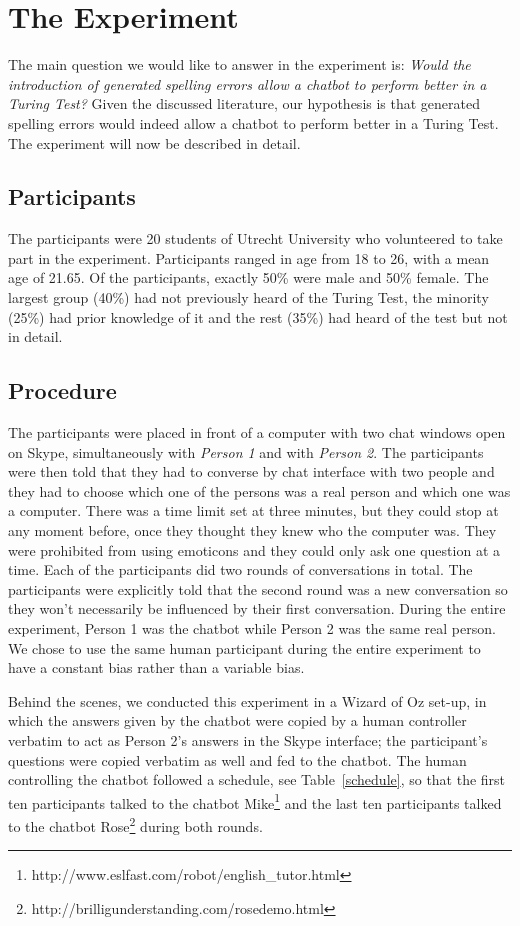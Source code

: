\section{The Experiment}
The main question we would like to answer in the experiment is: \textit{Would the introduction of generated spelling errors allow a chatbot to perform better in a Turing Test?} Given the discussed literature, our hypothesis is that generated spelling errors would indeed allow a chatbot to perform better in a Turing Test. The experiment will now be described in detail.


\subsection{Participants}
The participants were 20 students of Utrecht University who volunteered to take part in the experiment. Participants ranged in age from 18 to 26, with a mean age of 21.65. Of the participants, exactly 50\% were male and 50\% female. The largest group (40\%) had not previously heard of the Turing Test, the minority (25\%) had prior knowledge of it and the rest (35\%) had heard of the test but not in detail.


\subsection{Procedure}
The participants were placed in front of a computer with two chat windows open on Skype, simultaneously with \textit{Person 1} and with \textit{Person 2}. The participants were then told that they had to converse by chat interface with two people and they had to choose which one of the persons was a real person and which one was a computer. There was a time limit set at three minutes, but they could stop at any moment before, once they thought they knew who the computer was. They were prohibited from using emoticons and they could only ask one question at a time. Each of the participants did two rounds of conversations in total. The participants were explicitly told that the second round was a new conversation so they won't necessarily be influenced by their first conversation. During the entire experiment, Person 1 was the chatbot while Person 2 was the same real person. We chose to use the same human participant during the entire experiment to have a constant bias rather than a variable bias.

Behind the scenes, we conducted this experiment in a Wizard of Oz set-up, in which the answers given by the chatbot were copied by a human controller verbatim to act as Person 2's answers in the Skype interface; the participant's questions were copied verbatim as well and fed to the chatbot. The human controlling the chatbot followed a schedule, see Table~\ref{schedule}, so that the first ten participants talked to the chatbot Mike\footnote{http://www.eslfast.com/robot/english\_tutor.html} and the last ten participants talked to the chatbot Rose\footnote{http://brilligunderstanding.com/rosedemo.html} during both rounds.

